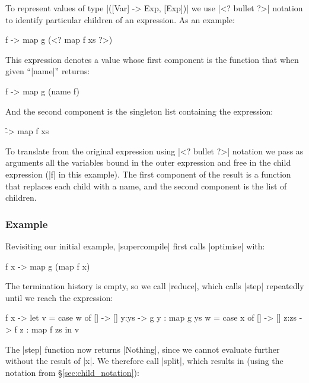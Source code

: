 \documentclass[draft]{sigplanconf}
\begin{document}
To represent values of type |([Var] -> Exp, [Exp])| we use |<? bullet ?>| notation to identify particular children of an expression. As an example:

\begin{code}
\g f -> map g (<? map f xs ?>)
\end{code}

\noindent This expression denotes a value whose first component is the function that when given ``|name|'' returns:

\begin{code}
\g f -> map g (name f)
\end{code}

\noindent And the second component is the singleton list containing the expression:

\begin{code}
\f -> map f xs
\end{code}

To translate from the original expression using |<? bullet ?>| notation we pass as arguments all the variables bound in the outer expression and free in the child expression (|f| in this example). The first component of the result is a function that replaces each child with a name, and the second component is the list of children.

\subsubsection{Example}
\label{sec:manager_example}

Revisiting our initial example, |supercompile| first calls |optimise| with:

\begin{code}
\g f x -> map g (map f x)
\end{code}

The termination history is empty, so we call |reduce|, which calls |step| repeatedly until we reach the expression:

\begin{code}
\g f x ->  let  v = case  w of
                          []    -> []
                          y:ys  -> g y : map g ys
                w = case  x of
                          []    -> []
                          z:zs  -> f z : map f zs
           in   v
\end{code}

The |step| function now returns |Nothing|, since we cannot evaluate further without the result of |x|. We therefore call |split|, which results in (using the notation from \S\ref{sec:child_notation}):
\end{document}
